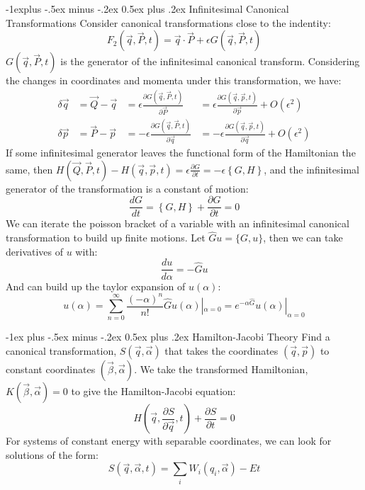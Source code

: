 \documentclass[10pt,landscape]{article}
\makeatletter
\renewcommand{\section}{\@startsection{section}{1}{0mm}%
                                {-1ex plus -.5ex minus -.2ex}%
                                {0.5ex plus .2ex}%
                                {\normalfont\large\bfseries}}
\renewcommand{\subsection}{\@startsection{subsection}{2}{0mm}%
                                {-1explus -.5ex minus -.2ex}%
                                {0.5ex plus .2ex}%
                                {\normalfont\normalsize\bfseries}}
\makeatother
\begin{document}
\begin{multicols}{3}
\subsection{Infinitesimal Canonical Transformations}
Consider canonical transformations close to the indentity:
\begin{equation}
	F_2(\vec{q}, \vec{P}, t) = \vec{q}\cdot\vec{P} + \epsilon G(\vec{q}, \vec{P}, t)
\end{equation}
$G(\vec{q}, \vec{P}, t)$ is the generator of the infinitesimal canonical transform.
Considering the changes in coordinates and momenta under this transformation, we have:
\begin{align}
	\delta \vec{q} &= \vec{Q}-\vec{q} &= \epsilon \frac{\partial G(\vec{q},\vec{P},t)}{\partial \vec{P}} &=\epsilon \frac{\partial G(\vec{q},\vec{p},t)}{\partial \vec{p}} + O(\epsilon^2) \\
	\delta \vec{p} &= \vec{P}-\vec{p} &= -\epsilon \frac{\partial G(\vec{q},\vec{P},t)}{\partial \vec{q}}  &= -\epsilon \frac{\partial G(\vec{q},\vec{p},t)}{\partial \vec{q}} + O(\epsilon^2)
\end{align}
If some infinitesimal generator leaves the functional form of the Hamiltonian the same, then $H(\vec{Q}, \vec{P}, t) - H(\vec{q}, \vec{p}, t) = \epsilon\frac{\partial G}{\partial t}=-\epsilon\left\{G, H\right\}$, and the infinitesimal generator of the transformation is a constant of motion:
\begin{equation}
	\frac{dG}{dt} = \left\{G, H\right\} + \frac{\partial G}{\partial t} = 0
\end{equation}
We can iterate the poisson bracket of a variable with an infinitesimal canonical transformation to build up finite motions. Let $\hat Gu=\{G, u\}$, then we can take derivatives of $u$ with:
\begin{equation}
	\frac{du}{d\alpha} = -\hat Gu
\end{equation}
And can build up the taylor expansion of $u(\alpha)$:
\begin{equation}
	u(\alpha) = \sum_{n=0}^{\infty}\frac{(-\alpha)^n}{n!}\hat Gu(\alpha)|_{\alpha=0}= e^{-\alpha\hat G} u(\alpha)|_{\alpha=0}
\end{equation}

\section{Hamilton-Jacobi Theory}
Find a canonical transformation, $S(\vec{q}, \vec \alpha)$ that takes the coordinates $(\vec q, \vec p)$ to constant coordinates $(\vec \beta, \vec \alpha)$. We take the transformed Hamiltonian, $K(\vec \beta, \vec \alpha)=0$ to give the Hamilton-Jacobi equation:
\begin{equation}
	H(\vec q, \frac{\partial S}{\partial \vec{q}}, t) + \frac{\partial S}{\partial t} = 0
\end{equation}
For systems of constant energy with separable coordinates, we can look for solutions of the form:
\begin{equation}
	S(\vec q, \vec \alpha, t) = \sum_i W_i(q_i, \vec \alpha) - Et
\end{equation}


\end{multicols}
\end{document}
